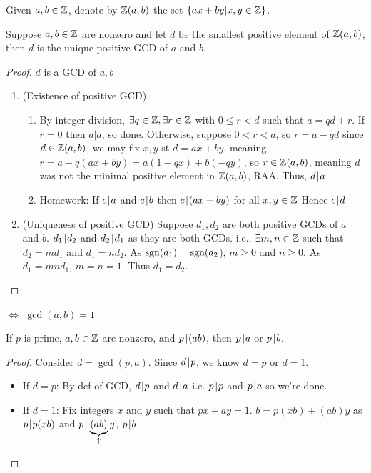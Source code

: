 \documentclass[notes.tex]{subfiles}
\begin{document}

\begin{definition}
	Given $a, b\in\mathbb{Z}$, denote by $\mathbb{Z}(a, b)$ the set $\{ax+by | x,y\in\mathbb{Z}\}$.
\end{definition}

\begin{theorem}
	 Suppose $a, b\in\mathbb{Z}$ are nonzero and let $d$ be the smallest positive element of $\mathbb{Z}(a, b)$, then $d$ is the unique positive GCD of $a$ and $b$.
\end{theorem}
\begin{proof}
	$d$ is a GCD of $a, b$
	\begin{enumerate}
		\item (Existence of positive GCD)
		\begin{enumerate}
			\item By integer division, $\exists q \in \mathbb{Z}, \exists r\in \mathbb{Z}$ with $0\le r < d$ such that $a = qd+r$. If $r=0$ then $d|a$, so done.
			Otherwise, suppose $0 < r < d$, so $r = a-qd$
			since $d\in\mathbb{Z}(a, b)$, we may fix $x, y$ st $d=ax+by$, meaning $r=a-q(ax+by) = a(1-qx) + b(-qy)$, so $r\in \mathbb{Z}(a, b)$, meaning $d$ was not the minimal positive element in $\mathbb{Z}(a, b)$, RAA.
			Thus, $d\mkern2mu|\mkern1mu a$
			\item
			Homework: If $c\mkern2mu|\mkern1mu a$ and $c\mkern2mu|\mkern1mu b$ then $c\mkern2mu|\mkern1mu(ax+by)$ for all $x, y\in\mathbb{Z}$ Hence $c\mkern2mu|\mkern1mu d$
		\end{enumerate}
		\item (Uniqueness of positive GCD)
			Suppose $d_1, d_2$ are both positive GCDs of $a$ and $b$.
			$d_1\mkern2mu|\mkern1mu d_2$ and $d_2 \mkern2mu|\mkern1mu d_1$ as they are both GCDs. i.e., $\exists m, n \in\mathbb{Z}$ such that $d_2=md_1$ and $d_1=nd_2$. As $\operatorname{\mathrm{sgn}}(d_1) = \operatorname{\mathrm{sgn}}(d_2$), $m \ge 0$ and $n \ge 0$. As $d_1 = mn d_1$, $m = n = 1$. Thus $d_1 = d_2$.
	\end{enumerate}
\end{proof}

\begin{definition}
	 $\iff$ $\gcd(a, b) = 1$
\end{definition}

\begin{theorem}
	If $p$ is prime, $a, b\in\mathbb{Z}$ are nonzero, and $p\mkern2mu|\mkern1mu (ab)$, then $p\mkern2mu|\mkern1mu a$ or $p\mkern2mu|\mkern1mu b$.
\end{theorem}

\begin{proof}
	Consider $d = \gcd(p, a)$. Since $d\mkern2mu|\mkern1mu p$, we know $d=p$ or $d = 1$.
	\begin{itemize}
		\item[] If $d=p$: By def of GCD, $d\mkern2mu|\mkern1mu p$ and $d\mkern2mu|\mkern1mu a$ i.e. $p\mkern2mu|\mkern1mu p$ and $p \mkern2mu|\mkern1mu a$ so we're done.
		\item[] If $d=1$: Fix integers $x$ and $y$ such that $px+ay=1$. $b=p(xb)+(ab)y$
		as $p\mkern2mu|\mkern1mu p(xb)$ and $p\mkern2mu|\mkern1mu \underbrace{(ab)}_{\uparrow}y$, $p\mkern2mu|\mkern1mu b$.
	\end{itemize}
\end{proof}
\end{document}

